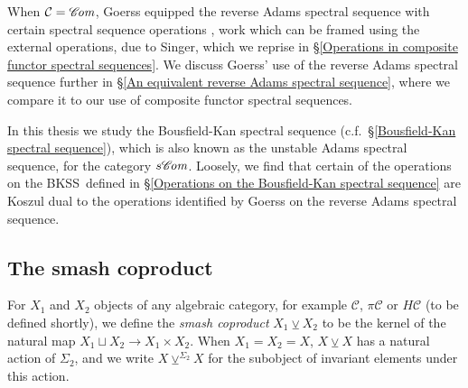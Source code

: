\documentclass[11pt]{amsart} \renewcommand{\baselinestretch}{1.2}
\theoremstyle{plain}
\numberwithin{equation}{section} %
\theoremstyle{plain}
\numberwithin{equation}{chapter} %
\renewcommand{\to}{\longrightarrow}
\newcommand{\scrC}{\mathscr{C}}
\newcommand{\calc}{\mathcal{C}}
\newcommand{\citeBOX}[2][]{\cite[\mbox{#1}]{#2}}
\newcommand{\PA}[1]{\pi#1}
\newcommand{\HA}[1]{H#1}
\newcommand{\algs}{{\scrC\!\textit{\normalfont\textit{om}}}}
\newcommand{\smashcoprod}{\veebar}%
\newcommand{\BKSS}{BKSS}
\newcommand{\SubsectionOrSection}[1]{\subsection{#1}}
\begin{document}
\begin{Pi-algebras and cohomology algebras}
When $\calc=\algs$, Goerss equipped the reverse Adams spectral sequence with certain spectral sequence operations \citeBOX[\S14]{MR1089001}, work which can be framed using the external operations, due to Singer, which we reprise in \S\ref{Operations in composite functor spectral sequences}. We discuss Goerss' use of the reverse Adams spectral sequence further in \S\ref{An equivalent reverse Adams spectral sequence}, where we compare it to our use of composite functor spectral sequences.

In this thesis we study the Bousfield-Kan spectral sequence (c.f.\ \S\ref{Bousfield-Kan spectral sequence}), which is also known as the unstable Adams spectral sequence, for the category $s\algs$. %
Loosely, we find that certain of the operations on the \BKSS\ defined in \S\ref{Operations on the Bousfield-Kan spectral sequence} are Koszul dual to the operations identified by Goerss on the reverse Adams spectral sequence.



\SubsectionOrSection{The smash coproduct}\label{subseq:The smash coproduct}
For $X_1$ and $X_2$ objects of any algebraic category, for example $\calc$, $\PA{\calc}$ or $\HA{\calc}$ (to be defined shortly), we define the \emph{smash coproduct} $X_1\smashcoprod X_2$ to be the kernel of the natural map $X_1\sqcup X_2\to X_1\times X_2$. When $X_1=X_2=X$, $X\smashcoprod X$ has a natural action of $\Sigma_2$, and we write $X\smashcoprod^{\Sigma_2} X$ for the subobject of invariant elements under this action.


\end{Pi-algebras and cohomology algebras}
\end{document}
